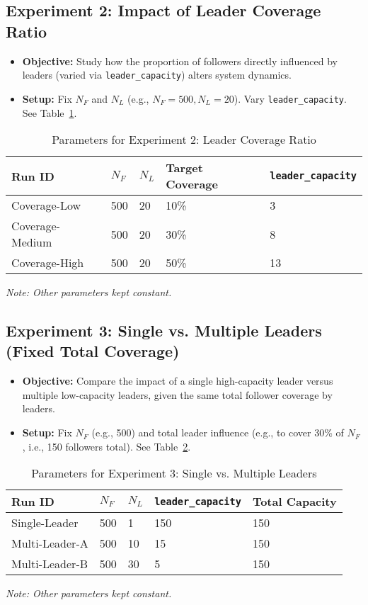 \documentclass[11pt]{article}
\begin{document}
\subsection{Experiment 2: Impact of Leader Coverage Ratio}
\begin{itemize}
    \item \textbf{Objective:} Study how the proportion of followers directly influenced by leaders (varied via \texttt{leader\_capacity}) alters system dynamics.
    \item \textbf{Setup:} Fix $N_F$ and $N_L$ (e.g., $N_F=500, N_L=20$). Vary \texttt{leader\_capacity}. See Table~\ref{tab:exp2_params}.
\end{itemize}
\begin{table}[H]
    \centering
    \caption{Parameters for Experiment 2: Leader Coverage Ratio}
    \label{tab:exp2_params}
    \begin{tabular}{lllll}
        \toprule
        Run ID & $N_F$ & $N_L$ & Target Coverage & \texttt{leader\_capacity} \\
        \midrule
        Coverage-Low    & 500 & 20 & 10\% & 3 \\
        Coverage-Medium & 500 & 20 & 30\% & 8 \\
        Coverage-High   & 500 & 20 & 50\% & 13  \\
        \bottomrule
    \end{tabular}
    \parbox{\textwidth}{\footnotesize \textit{Note: Other parameters kept constant.}}
\end{table}

\subsection{Experiment 3: Single vs. Multiple Leaders (Fixed Total Coverage)}
\begin{itemize}
    \item \textbf{Objective:} Compare the impact of a single high-capacity leader versus multiple low-capacity leaders, given the same total follower coverage by leaders.
    \item \textbf{Setup:} Fix $N_F$ (e.g., 500) and total leader influence (e.g., to cover 30\% of $N_F$, i.e., 150 followers total). See Table~\ref{tab:exp3_params}.
\end{itemize}
\begin{table}[H]
    \centering
    \caption{Parameters for Experiment 3: Single vs. Multiple Leaders}
    \label{tab:exp3_params}
    \begin{tabular}{lllll}
        \toprule
        Run ID & $N_F$ & $N_L$ & \texttt{leader\_capacity} & Total Capacity \\
        \midrule
        Single-Leader & 500 & 1  & 150 & 150 \\
        Multi-Leader-A& 500 & 10 & 15  & 150 \\
        Multi-Leader-B& 500 & 30 & 5   & 150 \\
        \bottomrule
    \end{tabular}
    \parbox{\textwidth}{\footnotesize \textit{Note: Other parameters kept constant.}}
\end{table}
\end{document}
